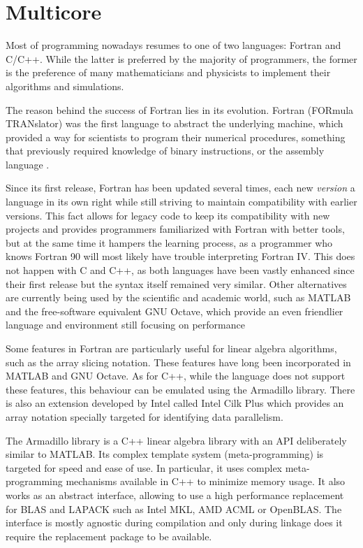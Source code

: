 \documentclass[../thesis]{subfiles}
\begin{document}
	\chapter{Multicore}
	Most of \hpc programming nowadays resumes to one of two languages: Fortran and C/C++. While the latter is preferred by the majority of programmers, the former is the preference of many mathematicians and physicists to implement their algorithms and simulations.

	The reason behind the success of Fortran lies in its evolution. Fortran (FORmula TRANslator) was the first language to abstract the underlying machine, which provided a way for scientists to program their numerical procedures, something that previously required knowledge of binary instructions, or the assembly language \cite{IBM100:Fortran}.

	Since its first release, Fortran has been updated several times, each new \textit{version} a language in its own right while still striving to maintain compatibility with earlier versions. This fact allows for legacy code to keep its compatibility with new projects and provides programmers familiarized with Fortran with better tools, but at the same time it hampers the learning process, as a programmer who knows Fortran 90 will most likely have trouble interpreting Fortran IV. This does not happen with C and C++, as both languages have been vastly enhanced since their first release but the syntax itself remained very similar. Other alternatives are currently being used by the scientific and academic world, such as MATLAB and the free-software equivalent GNU Octave, which provide an even friendlier language and environment still focusing on performance

	Some features in Fortran are particularly useful for linear algebra algorithms, such as the array slicing notation. These features have long been incorporated in MATLAB and GNU Octave. As for C++, while the language does not support these features, this behaviour can be emulated using the Armadillo library. There is also an extension developed by Intel called Intel Cilk Plus which provides an array notation specially targeted for identifying data parallelism.

	The Armadillo library is a C++ linear algebra library with an API deliberately similar to MATLAB. Its complex template system (meta-programming) is targeted for speed and ease of use. In particular, it uses complex meta-programming mechanisms available in C++ to minimize memory usage. It also works as an abstract interface, allowing to use a high performance replacement for BLAS and LAPACK such as Intel MKL, AMD ACML or OpenBLAS. The interface is mostly agnostic during compilation and only during linkage does it require the replacement package to be available.
\end{document}
